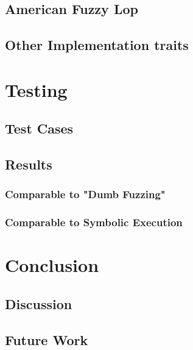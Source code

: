 \documentclass[a4paper]{article}
\begin{document}
\subsection{American Fuzzy Lop}
\subsection{Other Implementation traits}

\section{Testing}
\subsection{Test Cases}
\subsection{Results}
\subsubsection*{Comparable to "Dumb Fuzzing"}
\subsubsection*{Comparable to Symbolic Execution}




\begin{comment}

Listinglabels
diffToFuzz
SymExExample
\end{comment}

\section{Conclusion}
\subsection{Discussion}
\subsection{Future Work}
\end{document}
